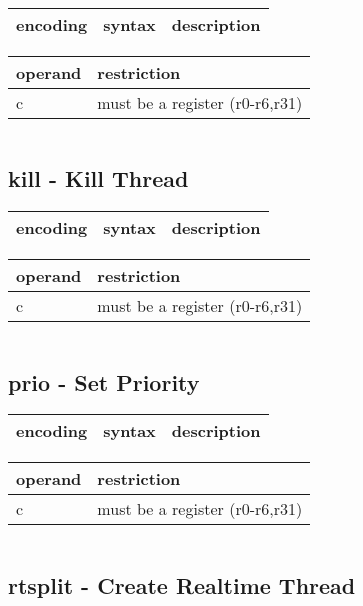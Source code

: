 \documentclass[letterpaper,10pt,openright,twoside,onecolumn]{book}
\begin{document}
  \begin{tabular}{|l|l|l|}
   \hline
    encoding & syntax & description \\
   \hline
   \hline
  \end{tabular}
  \flushleft
  \begin{tabular}{|l|l|}
   \hline
    operand & restriction \\
   \hline
    c & must be a register (r0-r6,r31) \\
   \hline
  \end{tabular}
  \begin{verbatim}
  \end{verbatim}
\newpage\subsection{kill - Kill Thread}
  \begin{tabular}{|l|l|l|}
   \hline
    encoding & syntax & description \\
   \hline
   \hline
  \end{tabular}
  \flushleft
  \begin{tabular}{|l|l|}
   \hline
    operand & restriction \\
   \hline
    c & must be a register (r0-r6,r31) \\
   \hline
  \end{tabular}
  \begin{verbatim}
  \end{verbatim}
\newpage\subsection{prio - Set Priority}
  \begin{tabular}{|l|l|l|}
   \hline
    encoding & syntax & description \\
   \hline
   \hline
  \end{tabular}
  \flushleft
  \begin{tabular}{|l|l|}
   \hline
    operand & restriction \\
   \hline
    c & must be a register (r0-r6,r31) \\
   \hline
  \end{tabular}
  \begin{verbatim}
  \end{verbatim}
\newpage\subsection{rtsplit - Create Realtime Thread}
\end{document}
